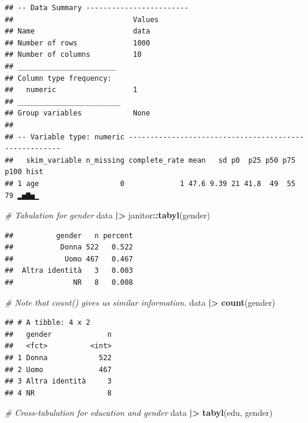 \documentclass[
]{book}
\newenvironment{Shaded}{\begin{snugshade}}{\end{snugshade}}
\newcommand{\CommentTok}[1]{\textcolor[rgb]{0.56,0.35,0.01}{\textit{#1}}}
\newcommand{\FunctionTok}[1]{\textcolor[rgb]{0.13,0.29,0.53}{\textbf{#1}}}
\newcommand{\NormalTok}[1]{#1}
\newcommand{\SpecialCharTok}[1]{\textcolor[rgb]{0.81,0.36,0.00}{\textbf{#1}}}
\begin{document}
\begin{verbatim}
## -- Data Summary ------------------------
##                            Values
## Name                       data  
## Number of rows             1000  
## Number of columns          10    
## _______________________          
## Column type frequency:           
##   numeric                  1     
## ________________________         
## Group variables            None  
## 
## -- Variable type: numeric ------------------------------------------------------
##   skim_variable n_missing complete_rate mean   sd p0  p25 p50 p75 p100 hist 
## 1 age                   0             1 47.6 9.39 21 41.8  49  55   79 ▂▅▇▅▁
\end{verbatim}

\begin{Shaded}
\begin{Highlighting}[]
\CommentTok{\# Tabulation for gender}
\NormalTok{data }\SpecialCharTok{|\textgreater{}} 
\NormalTok{  janitor}\SpecialCharTok{::}\FunctionTok{tabyl}\NormalTok{(gender)}
\end{Highlighting}
\end{Shaded}

\begin{verbatim}
##          gender   n percent
##           Donna 522   0.522
##            Uomo 467   0.467
##  Altra identità   3   0.003
##              NR   8   0.008
\end{verbatim}

\begin{Shaded}
\begin{Highlighting}[]
\CommentTok{\# Note that count() gives us similar information.}
\NormalTok{data }\SpecialCharTok{|\textgreater{}} 
  \FunctionTok{count}\NormalTok{(gender)}
\end{Highlighting}
\end{Shaded}

\begin{verbatim}
## # A tibble: 4 x 2
##   gender             n
##   <fct>          <int>
## 1 Donna            522
## 2 Uomo             467
## 3 Altra identità     3
## 4 NR                 8
\end{verbatim}

\begin{Shaded}
\begin{Highlighting}[]
\CommentTok{\# Cross{-}tabulation for education and gender}
\NormalTok{data }\SpecialCharTok{|\textgreater{}} 
  \FunctionTok{tabyl}\NormalTok{(edu, gender)}
\end{Highlighting}
\end{Shaded}
\end{document}
